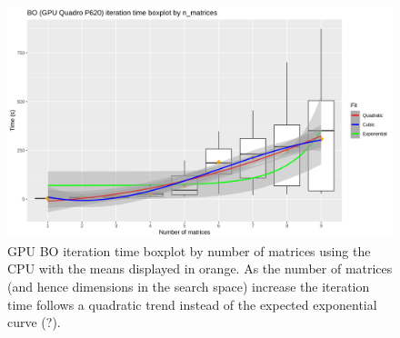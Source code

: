 \begin{figure}[h!]
\centering
\includegraphics[width=\textwidth]{figures/bo_boxplot_gpu}
\decoRule
\caption[BO iteration time boxplot (GPU)]{GPU BO iteration time boxplot by number of matrices using the CPU with the means displayed in orange. As the number of matrices (and hence dimensions in the search space) increase the iteration time follows a quadratic trend instead of the expected exponential curve (?).}
\label{fig:bo_boxplot_gpu}
\end{figure}